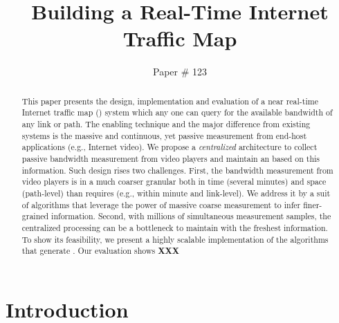 \documentclass[10pt,twocolumn]{article}
\newcommand{\fillme}{{\bf XXX}~}
\begin{document}
\title{\bf Building a Real-Time Internet Traffic Map}
\author{Paper \# 123}
\date{}
\maketitle
\thispagestyle{empty}


\maketitle 

\begin{abstract}
This paper presents the design, implementation and evaluation of a near real-time Internet traffic map (\itm) system which any one can query for the available bandwidth of any link or path. The enabling technique and the major difference from existing systems is the massive and continuous, yet passive measurement from end-host applications (e.g., Internet video). We propose a {\it centralized} architecture to collect passive bandwidth measurement from video players and maintain an \itm based on this information. Such design rises two challenges. First, the bandwidth measurement from video players is  in a much coarser granular both in time (several minutes) and space (path-level) than \itm requires (e.g., within minute and link-level). We address it by a suit of algorithms that leverage the power of massive coarse measurement to infer finer-grained information. Second, with millions of simultaneous measurement samples, the centralized processing can be a bottleneck to maintain \itm with the freshest information. To show its feasibility, we present a highly scalable implementation of the algorithms that generate \itm. Our evaluation shows \fillme
\end{abstract}

\section{Introduction}
\end{document}
